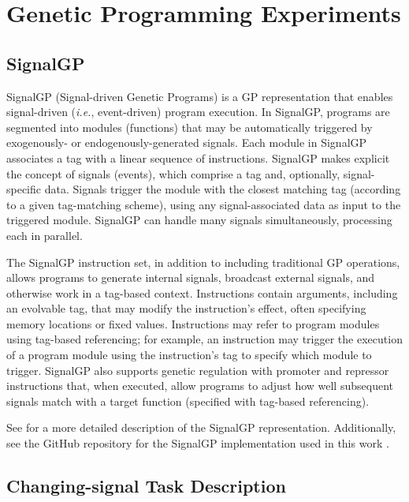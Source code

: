 

\section{Genetic Programming Experiments}
\label{sec:gpsupplement}


\subsection{SignalGP}

SignalGP (Signal-driven Genetic Programs) is a GP representation that enables signal-driven (\textit{i.e.}, event-driven) program execution.
In SignalGP, programs are segmented into modules (functions) that may be automatically triggered by exogenously- or endogenously-generated signals.
Each module in SignalGP associates a tag with a linear sequence of instructions.
SignalGP makes explicit the concept of signals (events), which comprise a tag and, optionally, signal-specific data.
Signals trigger the module with the closest matching tag (according to a given tag-matching scheme), using any signal-associated data as input to the triggered module.
SignalGP can handle many signals simultaneously, processing each in parallel.

The SignalGP instruction set, in addition to including traditional GP operations, allows programs to generate internal signals, broadcast external signals, and otherwise work in a tag-based context.
Instructions contain arguments, including an evolvable tag, that may modify the instruction's effect, often specifying memory locations or fixed values.
Instructions may refer to program modules using tag-based referencing; for example, an instruction may trigger the execution of a program module using the instruction's tag to specify which module to trigger.
SignalGP also supports genetic regulation with promoter and repressor instructions that, when executed, allow programs to adjust how well subsequent signals match with a target function (specified with tag-based referencing).

See  for a more detailed description of the SignalGP representation. Additionally, see the GitHub repository for the SignalGP implementation used in this work .

\subsection{Changing-signal Task Description}

